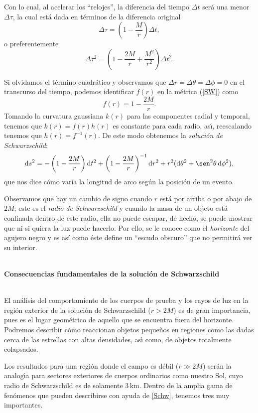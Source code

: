 \documentclass[12pt]{article}
\newcommand{\dx}{\textrm{d}}
\begin{document}
Con lo cual, al acelerar los ``relojes'', la diferencia del tiempo $\Delta t$ ser\'a una menor $\Delta\tau$, la cual est\'a dada en t\'erminos de la diferencia original
  $$\Delta\tau = \left( 1 - \frac{M}{r} \right)\Delta t,$$
o preferentemente
  $$\Delta\tau^2=\left( 1 - \frac{2M}{r} + \frac{M^2}{r^2} \right) \Delta t^2.$$

Si olvidamos el t\'ermino cuadr\'atico y observamos que $\Delta r = \Delta\theta = \Delta\phi = 0$ en el transcurso del tiempo, podemos identificar $f(r)$ en la m\'etrica (\ref{SW}) como
  $$f(r)=1-\frac{2M}{r}.$$
Tomando la curvatura gaussiana $k(r)$ para las componentes radial y temporal, tenemos que $k(r)=f(r)h(r)$ es constante para cada radio, as\'{\i}, reescalando tenemos que $h(r)=f^{-1}(r)$. De este modo obtenemos la \textit{solución de Schwarzschild}:
\begin{equation}
\label{Schw}
\dx s^2 = -\left( 1 - \frac{2M}{r}\right) \dx t^2 + \left( 1 - \frac{2M}{r} \right)^{-1} \dx r^2 + r^2(\dx \theta^2 + \sen^2\theta \, \dx\phi^2),
\end{equation}
que nos dice cómo varía la longitud de arco según la posición de un evento.

Observamos que hay un cambio de signo cuando $r$ está por arriba o por abajo de $2M$; este es el \emph{radio de Schwarzschild} y cuando la masa de un objeto está confinada dentro de este radio, ella no puede escapar, de hecho, se puede mostrar que ni si quiera la luz puede hacerlo. Por ello, se le conoce como el \emph{horizonte} del agujero negro y es así como éste define un ``escudo obscuro'' que no permitirá ver su interior.



\ \\
\textbf{\large Consecuencias fundamentales de la soluci\'on de Schwarzschild}

\ \\
El an\'alisis del comportamiento de los cuerpos de prueba y los rayos de luz en la regi\'on exterior de la soluci\'on de Schwarzschild ($r > 2M$) es de gran importancia, pues es el lugar geométrico de aquello que se encuentra fuera del horizonte. Podremos describir cómo reaccionan objetos pequeños en regiones como las dadas cerca de las estrellas con altas densidades, as\'{\i} como, de objetos totalmente colapsados.

Los resultados para una regi\'on donde el campo es d\'ebil ($r\gg 2M$) serán la analog\'{\i}a para sectores exteriores de cuerpos ordinarios como nuestro Sol, cuyo radio de Schwarzschild es de solamente $3$\,km. Dentro de la amplia gama de fenómenos que pueden describirse con ayuda de \eqref{Schw}, tenemos tres muy importantes.
\end{document}
